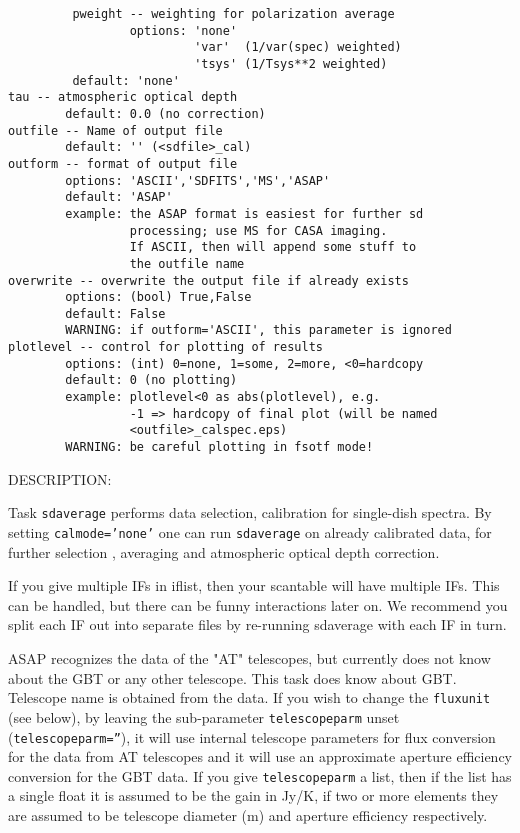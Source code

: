 \begin{verbatim}
         pweight -- weighting for polarization average
                 options: 'none'
                          'var'  (1/var(spec) weighted)
                          'tsys' (1/Tsys**2 weighted)
         default: 'none'
tau -- atmospheric optical depth
        default: 0.0 (no correction)
outfile -- Name of output file
        default: '' (<sdfile>_cal)
outform -- format of output file
        options: 'ASCII','SDFITS','MS','ASAP'
        default: 'ASAP'
        example: the ASAP format is easiest for further sd
                 processing; use MS for CASA imaging.
                 If ASCII, then will append some stuff to
                 the outfile name
overwrite -- overwrite the output file if already exists
        options: (bool) True,False
        default: False
        WARNING: if outform='ASCII', this parameter is ignored
plotlevel -- control for plotting of results
        options: (int) 0=none, 1=some, 2=more, <0=hardcopy
        default: 0 (no plotting)
        example: plotlevel<0 as abs(plotlevel), e.g.
                 -1 => hardcopy of final plot (will be named
                 <outfile>_calspec.eps)
        WARNING: be careful plotting in fsotf mode!
\end{verbatim}

  DESCRIPTION:

  Task {\tt sdaverage} performs data selection, calibration for single-dish
  spectra.  By setting {\tt calmode='none'}
  one can run {\tt sdaverage} on already calibrated data, for further selection
  , averaging and atmospheric optical depth correction.

  If you give multiple IFs in iflist, then your scantable will have
  multiple IFs.  This can be handled, but there can be funny interactions
  later on.  We recommend you split each IF out into separate files
  by re-running sdaverage with each IF in turn.

  ASAP recognizes the data of the "AT" telescopes, but currently
  does not know about the GBT or any other telescope. This task
  does know about GBT. Telescope name is obtained from the data.
  If you wish to change the {\tt fluxunit} (see below), by leaving
  the sub-parameter {\tt telescopeparm} unset ({\tt telescopeparm=''}),
  it will use internal telescope parameters for
  flux conversion for the data from AT telescopes and it will use an
  approximate aperture efficiency conversion for the GBT data.
  If you give {\tt telescopeparm} a list, then if the list has a single float it
  is assumed to be the gain in Jy/K, if two or more elements they are assumed
  to be telescope diameter (m) and aperture efficiency
  respectively.

